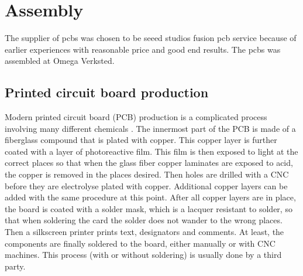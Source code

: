\section{Assembly}
The supplier of pcbs was chosen to be seeed studios fusion pcb service because of earlier experiences with reasonable price and good end results. The pcbs was assembled at Omega Verksted.

\subsection{Printed circuit board production}
Modern printed circuit board (PCB) production is a complicated process involving many different chemicals \citep{pcbprod}. The innermost part of the PCB is made of a fiberglass compound that is plated with copper. This copper layer is further coated with a layer of photoreactive film. This film is then exposed to light at the correct places so that when the glass fiber copper laminates are exposed to acid, the copper is removed in the places desired. Then holes are drilled with a CNC before they are electrolyse plated with copper. Additional copper layers can be added with the same procedure at this point. After all copper layers are in place, the board is coated with a solder mask, which is a lacquer resistant to solder, so that when soldering the card the solder does not wander to the wrong places. Then a silkscreen printer prints text, designators and comments. At least, the components are finally soldered to the board, either manually or with CNC machines. This process (with or without soldering) is usually done by a third party.